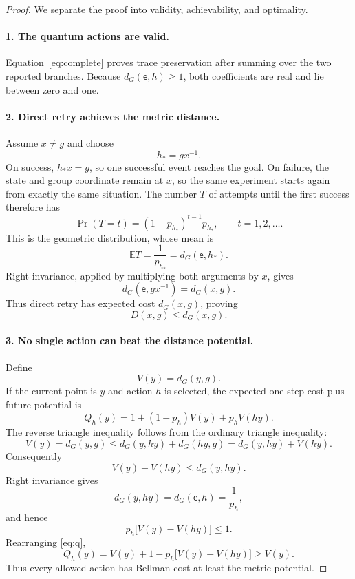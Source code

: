 \documentclass[11pt]{article}
\theoremstyle{definition}
\theoremstyle{remark}
\newcommand{\E}{\mathbb E}
\newcommand{\id}{\mathsf e}
\begin{document}
\begin{proof}
We separate the proof into validity, achievability, and optimality.

\paragraph{1. The quantum actions are valid.}
Equation~\eqref{eq:complete} proves trace preservation after summing over the
two reported branches. Because \(d_G(\id,h)\ge1\), both coefficients are real
and lie between zero and one.

\paragraph{2. Direct retry achieves the metric distance.}
Assume \(x\ne g\) and choose
\[
  h_*=gx^{-1}.
\]
On success, \(h_*x=g\), so one successful event reaches the goal. On failure,
the state and group coordinate remain at \(x\), so the same experiment starts
again from exactly the same situation. The number \(T\) of attempts until
the first success therefore has
\[
  \Pr(T=t)=(1-p_{h_*})^{t-1}p_{h_*},\qquad t=1,2,\ldots.
\]
This is the geometric distribution, whose mean is
\[
  \E T=\frac{1}{p_{h_*}}=d_G(\id,h_*).
\]
Right invariance, applied by multiplying both arguments by \(x\), gives
\[
  d_G(\id,gx^{-1})=d_G(x,g).
\]
Thus direct retry has expected cost \(d_G(x,g)\), proving
\begin{equation}
  D(x,g)\le d_G(x,g).
  \label{eq:upper}
\end{equation}

\paragraph{3. No single action can beat the distance potential.}
Define
\[
  V(y)=d_G(y,g).
\]
If the current point is \(y\) and action \(h\) is selected, the expected
one-step cost plus future potential is
\begin{equation}
  Q_h(y)=1+(1-p_h)V(y)+p_hV(hy).
  \label{eq:q}
\end{equation}
The reverse triangle inequality follows from the ordinary triangle
inequality:
\[
  V(y)=d_G(y,g)
  \le d_G(y,hy)+d_G(hy,g)
  =d_G(y,hy)+V(hy).
\]
Consequently
\[
  V(y)-V(hy)\le d_G(y,hy).
\]
Right invariance gives
\[
  d_G(y,hy)=d_G(\id,h)=\frac1{p_h},
\]
and hence
\begin{equation}
  p_h\bigl[V(y)-V(hy)\bigr]\le1.
  \label{eq:progress}
\end{equation}
Rearranging \eqref{eq:q},
\begin{equation}
 Q_h(y)=V(y)+1-p_h\bigl[V(y)-V(hy)\bigr]\ge V(y).
 \label{eq:bellman-lower}
\end{equation}
Thus every allowed action has Bellman cost at least the metric potential.


\end{proof}
\end{document}
